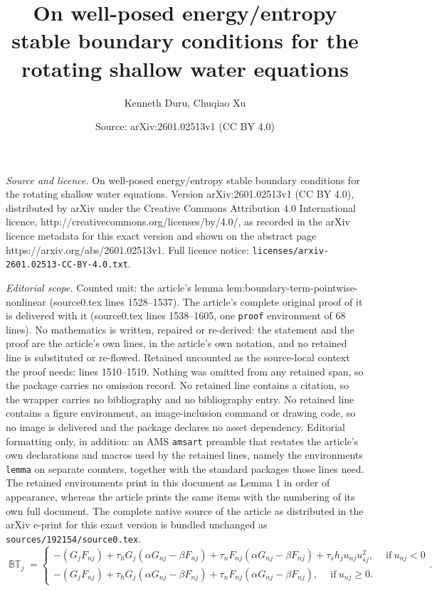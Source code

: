 \documentclass[10pt,a4paper]{amsart}
\title{On well-posed energy/entropy stable boundary conditions for the rotating shallow water equations}
\author{Kenneth Duru, Chuqiao Xu}
\date{Source: arXiv:2601.02513v1 (CC BY 4.0)}
\begin{document}
\maketitle

\noindent\emph{Source and licence.} On well-posed energy/entropy stable boundary conditions for the rotating shallow water equations. Version arXiv:2601.02513v1 (CC BY 4.0), distributed by arXiv under the Creative Commons Attribution 4.0 International licence, http://creativecommons.org/licenses/by/4.0/, as recorded in the arXiv licence metadata for this exact version and shown on the abstract page https://arxiv.org/abs/2601.02513v1. Full licence notice: \texttt{licenses/arxiv-2601.02513-CC-BY-4.0.txt}.\par\smallskip

\noindent\textit{Editorial scope.} Counted unit: the article's lemma lem:boundary-term-pointwise-nonlinear (source0.tex lines 1528--1537). The article's complete original proof of it is delivered with it (source0.tex lines 1538--1605, one \texttt{proof} environment of 68 lines). No mathematics is written, repaired or re-derived: the statement and the proof are the article's own lines, in the article's own notation, and no retained line is substituted or re-flowed.  Retained uncounted as the source-local context the proof needs: lines 1510--1519.  Nothing was omitted from any retained span, so the package carries no omission record.  No retained line contains a citation, so the wrapper carries no bibliography and no bibliography entry.  No retained line contains a figure environment, an image-inclusion command or drawing code, so no image is delivered and the package declares no asset dependency.  Editorial formatting only, in addition: an AMS \texttt{amsart} preamble that restates the article's own declarations and macros used by the retained lines, namely the environments \texttt{lemma} on separate counters, together with the standard packages those lines need.  The retained environments print in this document as Lemma 1 in order of appearance, whereas the article prints the same items with the numbering of its own full document.  The complete native source of the article as distributed in the arXiv e-print for this exact version is bundled unchanged as \texttt{sources/192154/source0.tex}.
\begin{equation}\label{eq:boundary-term-pointwise-nonlinear}
    \operatorname{\mathbb{BT}}_j =
\begin{cases}
-\left(G_{j}F_{nj}\right)+ \tau_h G_{j} \left(\alpha G_{nj} - \beta F_{nj}\right) +
     \tau_n F_{nj}\left(\alpha G_{nj} - \beta F_{nj}\right) + \tau_s h_{j} u_{nj} u_{sj}^2, \quad \ \text{if} \ u_{nj} < 0\\
%     
-\left(G_{j}F_{nj}\right)+ \tau_h G_{j} \left(\alpha G_{nj} - \beta F_{nj}\right) +
     \tau_n F_{nj}\left(\alpha G_{nj} - \beta F_{nj}\right) , \quad \ \text{if} \ u_{nj} \ge  0.
     \end{cases}.
\end{equation}
\end{document}
